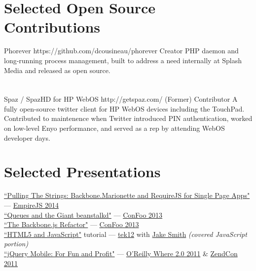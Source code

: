 \documentclass{resume}
\begin{document}
\section{Selected Open Source Contributions}

\project
	{Phorever}
	{https://github.com/dcousineau/phorever}
	{Creator}
	{PHP daemon and long-running process management, built to address a need internally at Splash Media and released as open source.}
\\ \\ \\
\project
	{Spaz / SpazHD for HP WebOS}
	{http://getspaz.com/}
	{\small{(Former)} \normalsize{Contributor}}
	{A fully open-source twitter client for HP WebOS devices including the TouchPad. Contributed to maintenence when Twitter introduced PIN authentication, worked on low-level Enyo performance, and served as a rep by attending WebOS developer days.}

\section{Selected Presentations}

\begin{spacing}{1.25}
\href{https://speakerdeck.com/dcousineau/pulling-the-strings-backbone-dot-marionette-and-require-dot-js-for-single-page-apps}{``Pulling The Strings: Backbone.Marionette and RequireJS for Single Page Apps"} --- \href{http://2014.empirejs.org/#/speakers}{EmpireJS 2014}\\
\href{https://speakerdeck.com/dcousineau/queues-and-the-giant-beanstalkd}{``Queues and the Giant beanstalkd"} --- \href{http://confoo.ca/}{ConFoo 2013}\\
\href{https://speakerdeck.com/dcousineau/the-backbone-dot-js-refactor}{``The Backbone.js Refactor"} --- \href{http://confoo.ca/}{ConFoo 2013}\\
\href{https://speakerdeck.com/u/dcousineau/p/html5-and-javascript-part-deux-javascript}{``HTML5 and JavaScript"} tutorial --- \href{http://tek12.phparch.com/talks/#HTML5-and-Javascript-for-the-PHP-Developer}{tek12} with \href{http://jakefolio.com/}{Jake Smith} \emph{(covered JavaScript portion)}
\\
\href{http://www.slideshare.net/eljefe/jquery-mobile-for-fun-and-profit}{``jQuery Mobile: For Fun and Profit"} --- \href{http://whereconf.com/where2011/public/schedule/speaker/110352}{O'Reilly Where 2.0 2011} \& \href{http://zendcon.com/2011/speaker/#4054}{ZendCon 2011}
\end{spacing}
\end{document}

